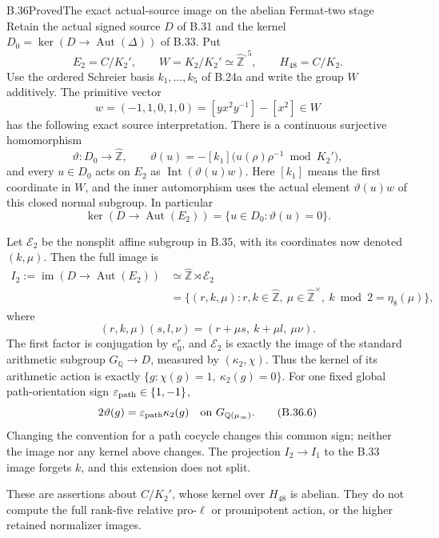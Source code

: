\begin{statement}{B.36}{Proved}{The exact actual-source image on the abelian Fermat-two stage}
Retain the actual signed source $D$ of B.31 and the kernel
$D_0=\ker(D\to\operatorname{Aut}(\Delta))$ of B.33.  Put
\[
 E_2=C/K_2',\qquad W=K_2/K_2'\simeq\widehat{\mathbb Z}^{,5},
 \qquad H_{48}=C/K_2.
\]
Use the ordered Schreier basis $k_1,\ldots,k_5$ of B.24a and
write the group $W$ additively.  The primitive vector
\[
 w=(-1,1,0,1,0)
    =[yx^2y^{-1}]-[x^2]\in W                         \tag{B.36.1}
\]
has the following exact source interpretation.  There is a
continuous surjective homomorphism
\[
 \vartheta:D_0\longrightarrow\widehat{\mathbb Z},
 \qquad
 \vartheta(u)=-[k_1]\bigl(u(\rho)\rho^{-1}\bmod K_2'\bigr),
                                                        \tag{B.36.2}
\]
and every $u\in D_0$ acts on $E_2$ as
$\operatorname{Int}(\vartheta(u)w)$.  Here $[k_1]$ means
the first coordinate in $W$, and the inner automorphism uses
the actual element $\vartheta(u)w$ of this closed normal subgroup.
In particular
\[
 \ker(D\longrightarrow\operatorname{Aut}(E_2))
                 =\{u\in D_0:\vartheta(u)=0\}.          \tag{B.36.3}
\]

Let $\mathcal E_2$ be the nonsplit affine subgroup in B.35,
with its coordinates now denoted $(k,\mu)$.  Then the full image is
\[
 \begin{split}
 I_2:=\operatorname{im}(D\to\operatorname{Aut}(E_2))
   &\simeq\widehat{\mathbb Z}\rtimes\mathcal E_2\\
   &=\{(r,k,\mu):r,k\in\widehat{\mathbb Z},\
       \mu\in\widehat{\mathbb Z}^{\times},\
       k\bmod2=\eta_8(\mu)\},                           \tag{B.36.4}
 \end{split}
\]
where
\[
 (r,k,\mu)(s,l,\nu)
       =(r+\mu s,\ k+\mu l,\ \mu\nu).
                                                        \tag{B.36.5}
\]
The first factor is conjugation by $e_0^r$, and
$\mathcal E_2$ is exactly the image of the standard arithmetic
subgroup $G_{\mathbb Q}\to D$, measured by
$(\kappa_2,\chi)$.  Thus the kernel of its arithmetic action
is exactly $\{g:\chi(g)=1,\ \kappa_2(g)=0\}$.
For one fixed global path-orientation sign
$\varepsilon_{\rm path}\in\{1,-1\}$,
\[
 2\vartheta(g)=\varepsilon_{\rm path}\kappa_2(g)
 \quad\text{on }G_{\mathbb Q(\mu_\infty)}.              \tag{B.36.6}
\]
Changing the convention for a path cocycle changes this common
sign; neither the image nor any kernel above changes.
The projection $I_2\to I_1$ to the B.33 image forgets $k$,
and this extension does not split.

These are assertions about $C/K_2'$, whose kernel over $H_{48}$
is abelian.  They do not compute the full rank-five relative
pro-$\ell$ or prounipotent action, or the higher retained
normalizer images.
\end{statement}
